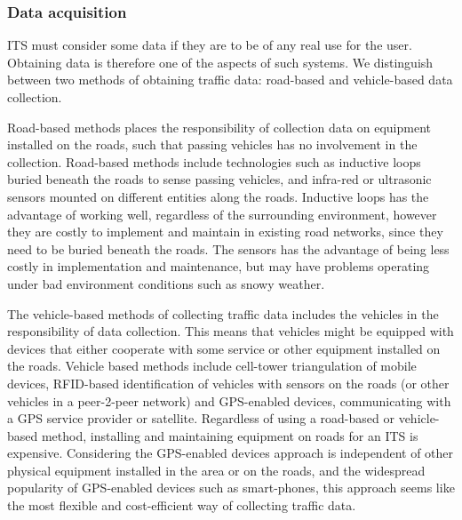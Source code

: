 \subsubsection*{Data acquisition}
ITS must consider some data if they are to be of any real use for the user. Obtaining data is therefore one of the aspects of such systems. We distinguish between two methods of obtaining traffic data: road-based and vehicle-based data collection. 

Road-based methods places the responsibility of collection data on equipment installed on the roads, such that passing vehicles has no involvement in the collection. Road-based methods\cite{PIARC0} include technologies such as inductive loops buried beneath the roads to sense passing vehicles, and infra-red or ultrasonic sensors mounted on different entities along the roads. Inductive loops has the advantage of working well, regardless of the surrounding environment, however they are costly to implement and maintain in existing road networks, since they need to be buried beneath the roads. The sensors has the advantage of being less costly in implementation and maintenance, but may have problems operating under bad environment conditions such as snowy weather\cite{KamranHaas2007,PIARC0}.

The vehicle-based methods of collecting traffic data includes the vehicles in the responsibility of data collection. This means that vehicles might be equipped with devices that either cooperate with some service or other equipment installed on the roads. Vehicle based methods include cell-tower triangulation of mobile devices, RFID-based identification of vehicles with sensors on the roads (or other vehicles in a peer-2-peer network) and GPS-enabled devices, communicating with a GPS service provider or satellite. Regardless of using a road-based or vehicle-based method, installing and maintaining equipment on roads for an ITS is expensive\cite{KamranHaas2007}. Considering the GPS-enabled devices approach is independent of other physical equipment installed in the area or on the roads, and the widespread popularity of GPS-enabled devices such as smart-phones, this approach seems like the most flexible and cost-efficient way of collecting traffic data.

